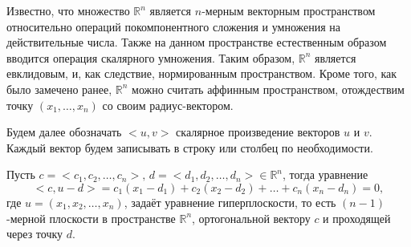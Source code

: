 
\begin{utv}
	Известно, что множество $\mathbb{R}^n$ является $n$-мерным векторным пространством относительно операций покомпонентного сложения и умножения на действительные числа. Также на данном пространстве естественным образом вводится операция скалярного умножения. Таким образом, $\mathbb{R}^n$ является евклидовым, и, как следствие, нормированным пространством. Кроме того, как было замечено ранее, $\mathbb{R}^n$ можно считать аффинным пространством, отождествим точку $(x_1, \dotsc, x_n)$ со своим радиус-вектором. 
	
	Будем далее обозначать $\big<u, v\big>$ скалярное произведение векторов $u$ и $v$. Каждый вектор будем записывать в строку или столбец по необходимости. 
\end{utv}

\begin{utv}
	Пусть $c = \big<c_1, c_2, \dotsc, c_n\big>, \, d = \big<d_1, d_2, \dotsc, d_n\big> \in \mathbb{R}^n$, тогда уравнение 
	\begin{equation*}
		\big<c, u - d\big> = c_1 (x_1 - d_1) + c_2 (x_2 - d_2) + \dotsc + c_n (x_n - d_n) = 0,
	\end{equation*}
	где $u = (x_1, x_2, \dotsc, x_n)$, задаёт уравнение гиперплоскости, то есть $(n - 1)$-мерной плоскости в пространстве $\mathbb{R}^n$, ортогональной вектору $c$ и проходящей через точку $d$.
\end{utv}

